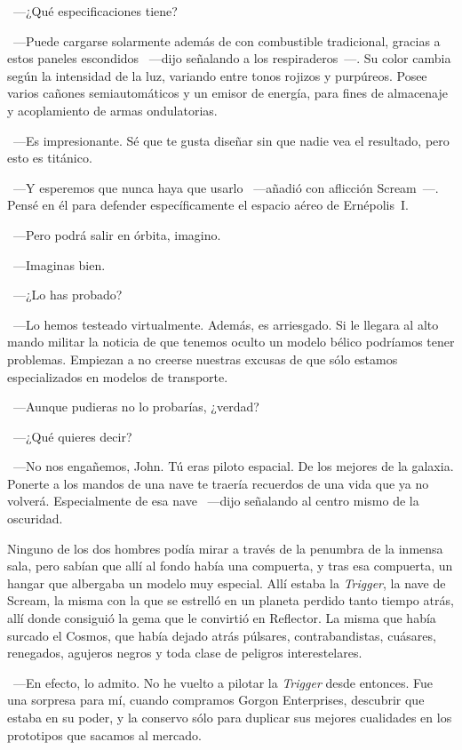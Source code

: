 ~---¿Qué especificaciones tiene?

~---Puede cargarse solarmente además de con combustible tradicional, gracias a estos paneles escondidos ~---dijo señalando a los respiraderos~---. Su color cambia según la intensidad de la luz, variando entre tonos rojizos y purpúreos. Posee varios cañones semiautomáticos y un emisor de energía, para fines de almacenaje y acoplamiento de armas ondulatorias.

~---Es impresionante. Sé que te gusta diseñar sin que nadie vea el resultado, pero esto es titánico.

~---Y esperemos que nunca haya que usarlo ~---añadió con aflicción Scream~---. Pensé en él para defender específicamente el espacio aéreo de Ernépolis~I.

~---Pero podrá salir en órbita, imagino.

~---Imaginas bien.

~---¿Lo has probado?

~---Lo hemos testeado virtualmente. Además, es arriesgado. Si le llegara al alto mando militar la noticia de que tenemos oculto un modelo bélico podríamos tener problemas. Empiezan a no creerse nuestras excusas de que sólo estamos especializados en modelos de transporte.

~---Aunque pudieras no lo probarías, ¿verdad?

~---¿Qué quieres decir?

~---No nos engañemos, John. Tú eras piloto espacial. De los mejores de la galaxia. Ponerte a los mandos de una nave te traería recuerdos de una vida que ya no volverá. Especialmente de esa nave ~---dijo señalando al centro mismo de la oscuridad.

Ninguno de los dos hombres podía mirar a través de la penumbra de la inmensa sala, pero sabían que allí al fondo había una compuerta, y tras esa compuerta, un hangar que albergaba un modelo muy especial. Allí estaba la \emph{Trigger}, la nave de Scream, la misma con la que se estrelló en un planeta perdido tanto tiempo atrás, allí donde consiguió la gema que le convirtió en Reflector. La misma que había surcado el Cosmos, que había dejado atrás púlsares, contrabandistas, cuásares, renegados, agujeros negros y toda clase de peligros interestelares.

~---En efecto, lo admito. No he vuelto a pilotar la \emph{Trigger} desde entonces. Fue una sorpresa para mí, cuando compramos Gorgon Enterprises, descubrir que estaba en su poder, y la conservo sólo para duplicar sus mejores cualidades en los prototipos que sacamos al mercado.

